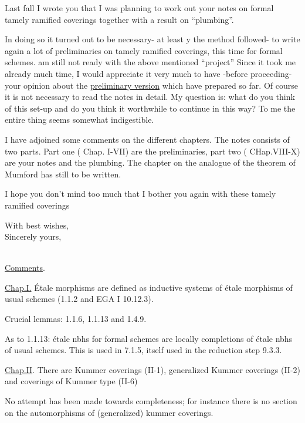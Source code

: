 Last fall I wrote you that I was planning to work out your notes on formal tamely ramified coverings together with a result on ``plumbing''.

In doing so it turned out to be necessary- at least y the method  followed- to write again a lot of preliminaries on tamely ramified coverings, this time for formal schemes.  am still not ready with the above mentioned ``project''\handwritten{!} Since it took me already much time, I would appreciate it very much to have -before proceeding- your opinion about the \uline{preliminary version} which  have prepared so far. Of course it is not necessary to read the notes in detail. My question is: what do you think of this set-up and do you think it worthwhile to continue in this way? To me the entire thing seems somewhat indigestible.

I have adjoined some comments on the different chapters. The notes consists of two parts. Part one ( Chap. I-VII) are the preliminaries, part two ( CHap.VIII-X) are your notes and the plumbing. The chapter on the analogue of the theorem of Mumford has still to be written.

I hope you don't mind too much that I bother you again with these tamely ramified coverings\handwritten{!}

With best wishes,\\
Sincerely yours,\\
\\


\uline{Comments}.

\uline{Chap.I.} \'{E}tale morphisms are defined as inductive systems of étale morphisms of usual schemes (1.1.2 and EGA I 10.12.3).

Crucial lemmas: 1.1.6, 1.1.13 and 1.4.9.

As to 1.1.13: étale nbhs for formal schemes are locally completions of étale nbhs of usual schemes. This is used in 7.1.5, itself used in the reduction step 9.3.3.

\uline{Chap.II}. There are Kummer coverings (II-1), generalized Kummer coverings (II-2) and coverings of Kummer type (II-6)\handwritten{!}

No attempt has been made towards completeness; for instance there is no section on the automorphisms of (generalized) kummer coverings.

